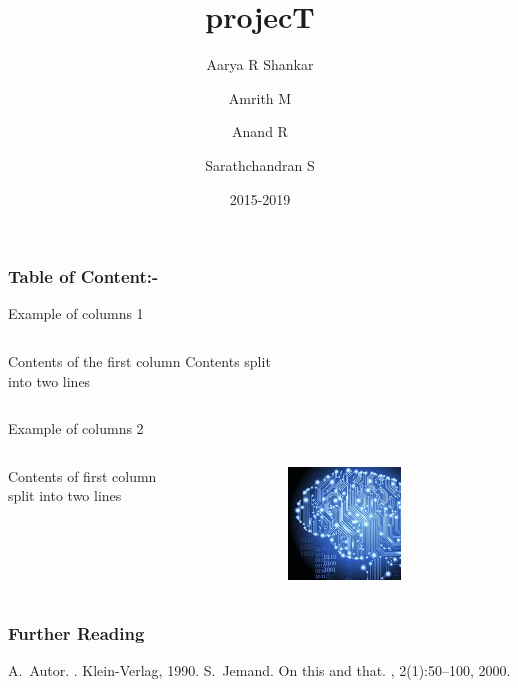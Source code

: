 \documentclass{beamer}
\title{projecT}
\author{Aarya R Shankar
			\and Amrith M
				 \and Anand R
					\and Sarathchandran S}
\institute{Department of Computer Science\and College of Engineering,Trivandrum}
\date{2015-2019}
\begin{document}
 

 
\frame{\titlepage}





\begin{frame}
\frametitle{Table of Content:-}
\tableofcontents[part=1,pausesections]
\end{frame}



\begin{frame}{Example of columns 1}

    \begin{columns}[c] %
     Contents of the first column
     Contents split \\ into two lines
    \end{columns}
\end{frame}





\begin{frame}{Example of columns 2}
     \begin{columns}[T] %
     \begin{column}[T]{5cm} %
     Contents of first column \\ split into two lines
     \end{column}
     \begin{column}[T]{5cm} %
          \includegraphics[height=3cm]{image.jpg}
     \end{column}
     \end{columns}
\end{frame}






\begin{frame}[allowframebreaks]
  \frametitle<presentation>{Further Reading}    
  \begin{thebibliography}{10}    
  \beamertemplatebookbibitems
    A.~Autor.
    .
    \newblock Klein-Verlag, 1990.
  \beamertemplatearticlebibitems
    S.~Jemand.
    \newblock On this and that.
    , 2(1):50--100, 2000.
  \end{thebibliography}
\end{frame}
 
\end{document}
